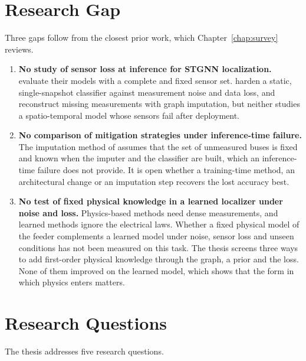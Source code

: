 \documentclass[MTech]{ugthesis}
\begin{document}
\section{Research Gap}

Three gaps follow from the closest prior work, which Chapter~\ref{chap:survey} reviews.

\begin{enumerate}
\item \textbf{No study of sensor loss at inference for \ac{STGNN} localization.} \citet{karabulut2026} evaluate their models with a complete and fixed sensor set. \citet{chen2020} harden a static, single-snapshot classifier against measurement noise and data loss, and \citet{zhang2025} reconstruct missing measurements with graph imputation, but neither studies a spatio-temporal model whose sensors fail after deployment.
\item \textbf{No comparison of mitigation strategies under inference-time failure.} The imputation method of \citet{zhang2025} assumes that the set of unmeasured buses is fixed and known when the imputer and the classifier are built, which an inference-time failure does not provide. It is open whether a training-time method, an architectural change or an imputation step recovers the lost accuracy best.
\item \textbf{No test of fixed physical knowledge in a learned localizer under noise and loss.} Physics-based methods need dense measurements, and learned methods ignore the electrical laws. Whether a fixed physical model of the feeder complements a learned model under noise, sensor loss and unseen conditions has not been measured on this task. The thesis screens three ways to add first-order physical knowledge through the graph, a prior and the loss. None of them improved on the learned model, which shows that the form in which physics enters matters.
\end{enumerate}

\section{Research Questions}
\label{sec:rq}

The thesis addresses five research questions.
\end{document}
